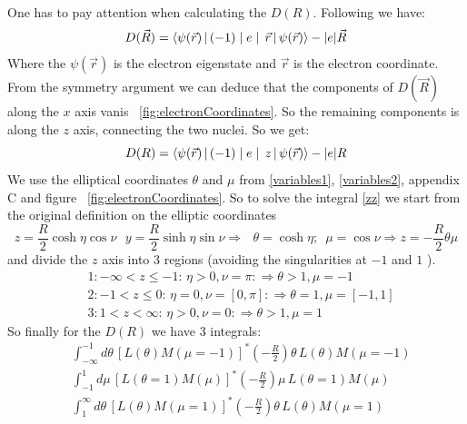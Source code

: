 One has to pay attention when calculating the $ D(R) $. Following \cite{DRZygelman} we have:
\begin{equation}
D(\vec{R}) = \Braket{\psi(\vec{r}) | (-1)\mid e \mid\,\vec{r} | \psi(\vec{r})} - |e|\vec{R}
\end{equation}
Where the $ \psi(\vec{r}) $ is the electron eigenstate and $ \vec{r} $ is the electron coordinate. 
From the symmetry argument we can deduce \cite{DRZygelman} that the components of $ D(\vec{R}) $ along the $ x $ axis vanis ~\ref{fig:electronCoordinates}. So the remaining components is along the
$ z $ axis, connecting the two nuclei. So we get:
\begin{equation}\label{zz}
D(R) = \Braket{\psi(\vec{r}) | (-1)\mid e \mid\,z | \psi(\vec{r})} - |e|R
\end{equation}
We use the elliptical coordinates $ \theta $ and $ \mu $ from \eqref{variables1}, \eqref{variables2}, appendix C and figure ~\ref{fig:electronCoordinates}.
So to solve the integral \eqref{zz} we start from the original definition on the elliptic coordinates
\begin{equation}
z = \frac{R}{2}\cosh\eta\cos\nu\,\,\,\, y = \frac{R}{2}\sinh\eta\sin\nu  \Rightarrow\,\,\,\,\theta = \cosh\eta;\,\,\,\mu=\cos\nu  \Rightarrow z=-\frac{R}{2}\theta\mu
\end{equation}
and divide the $ z $ axis into 3 regions (avoiding the singularities at $ -1 $ and $ 1 $ ).
\begin{equation}
\begin{split}
&1:-\infty < z \le -1:\,\eta > 0,\nu = \pi: \Rightarrow \theta > 1, \mu = -1 \\[.3em]
&2:-1 < z \le 0:\,\eta = 0,\nu = [0,\pi]: \Rightarrow \theta = 1, \mu = [-1,1] \\[.3em]
&3:1 < z < \infty:\,\eta > 0,\nu = 0: \Rightarrow \theta > 1, \mu = 1 
\end{split}
\end{equation}
So finally for the $ D(R) $ we have 3 integrals:
\begin{equation}
\begin{split}
& \int_{-\infty}^{-1}{d\theta\,\left[L(\theta)M(\mu=-1)\right]^{*}\left(-\frac{R}{2}\right)\theta\, L(\theta)M(\mu=-1)} \\[.5em]
& \int_{-1}^{1}{d\mu\,\left[L(\theta=1)M(\mu)\right]^{*}\left(-\frac{R}{2}\right)\mu\, L(\theta=1)M(\mu)} \\[.5em]
& \int_{1}^{\infty}{d\theta\,\left[L(\theta)M(\mu=1)\right]^{*}\left(-\frac{R}{2}\right)\theta\, L(\theta)M(\mu=1)}
\end{split}
\end{equation}

